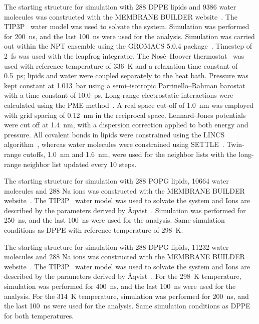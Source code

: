 \documentclass[journal=jpcbfk]{achemso}
\begin{document}
 The starting structure for simulation
with 288 DPPE lipids and 9386 water molecules
was constructed with the MEMBRANE BUILDER website~\cite{ghahremanpour13}. The TIP3P~\cite{jorgensen83} water model was used to solvate the system.
Simulation was performed for 200~ns, and the last 100~ns were used for the analysis. Simulation was carried out within the NPT ensemble using the GROMACS 5.0.4 package~\cite{abraham2015gromacs}. Timestep of 2~fs was used with the leapfrog integrator. The Nos\'{e}--Hoover thermostat~\cite{nose84,hoover85} was used with reference temperature of 336~K and a relaxation time constant of 0.5~ps; lipids and water were coupled separately to the heat bath. Pressure was kept constant at 1.013~bar using a semi--isotropic Parrinello--Rahman
barostat~\cite{parrinello81} with a time constant of 10.0~ps. Long-range electrostatic interactions were calculated using the PME method~\cite{darden93,essman95}. A real space cut-off of 1.0~nm was employed with grid spacing of 0.12~nm in the reciprocal space. Lennard-Jones potentials were cut off at 1.4~nm, with a dispersion correction applied to both energy and pressure. All covalent bonds in lipids were constrained using the LINCS algorithm~\cite{hess97}, whereas water molecules were constrained using SETTLE~\cite{miyamoto92}. Twin-range cutoffs, 1.0~nm and 1.6~nm, were used for the neighbor lists with the long-range neighbor list updated every 10 steps.

 The starting structure for simulation
with 288 POPG lipids, 10664 water molecules and 288 Na ions
was constructed with the MEMBRANE BUILDER website~\cite{ghahremanpour13}. The TIP3P~\cite{jorgensen83} water model was used to solvate the system and Ions are described by the parameters derived by \AA qvist~\cite{aqvist90}.
Simulation was performed for 250~ns, and the last 100~ns were used for the analysis. Same simulation conditions as DPPE with reference temperature of 298~K.


 The starting structure for simulation
with 288 DPPG lipids, 11232 water molecules and 288 Na ions
was constructed with the MEMBRANE BUILDER website~\cite{ghahremanpour13}. The TIP3P~\cite{jorgensen83} water model was used to solvate the system and Ions are described by the parameters derived by \AA qvist~\cite{aqvist90}. For the 298~K temperature, simulation was performed for 400~ns, and the last 100~ns were used for the analysis. For the 314~K temperature, simulation was performed for 200~ns, and the last 100~ns were used for the analysis. Same simulation conditions as DPPE for both temperatures.
\end{document}
